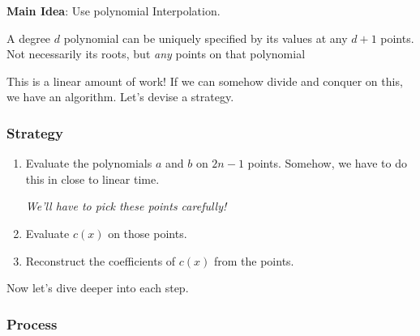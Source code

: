 \documentclass[12pt]{article}
\begin{document}
  {\bf Main Idea}: Use polynomial Interpolation.

  A degree $d$ polynomial can be uniquely specified by its values at any $d + 1$
  points. Not necessarily its roots, but {\it any} points on that polynomial


  This is a linear amount of work! If we can somehow divide and conquer on this,
  we have an algorithm. Let's devise a strategy.

  \subsubsection{Strategy}

  \begin{enumerate}
    \item Evaluate the polynomials $a$ and $b$ on $2n - 1$ points. Somehow, we
      have to do this in close to linear time.

      {\it We'll have to pick these points carefully!}


    \item Evaluate $c(x)$ on those points.

    \item Reconstruct the coefficients of $c(x)$ from the points.

  \end{enumerate}


  Now let's dive deeper into each step.

  \subsubsection{Process}
\end{document}

